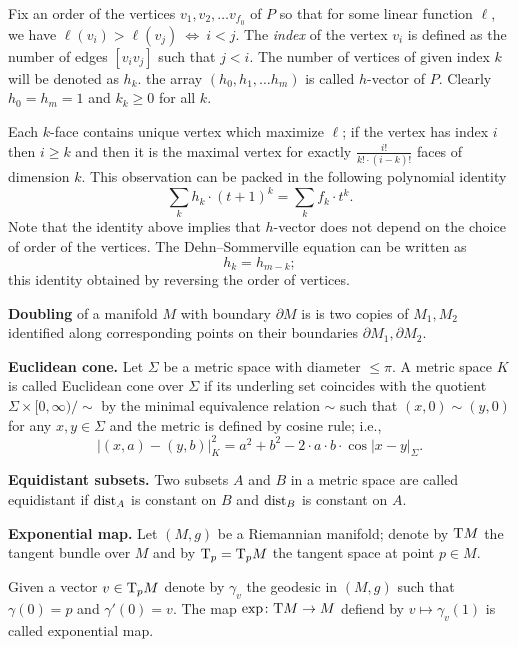 \begin{description}
Fix an order of the vertices $v_1,v_2,\dots v_{f_0}$
of $P$ so that for some linear function $\ell$, we have $\ell(v_i)>\ell(v_j)\ \Leftrightarrow\ i<j$.
The \emph{index} of the vertex $v_i$ 
is defined as the number of edges $[v_iv_j]$ such that $j<i$. 
The number of vertices of given index $k$ will be denoted as $h_k$.
the array $(h_0,h_1,\dots h_m)$ is called $h$-vector of $P$.
Clearly $h_0=h_m=1$ and $k_k\ge 0$ for all $k$.

Each $k$-face contains unique vertex which maximize $\ell$;
if the vertex has index $i$ then $i\ge k$ and
then it is the maximal vertex for exactly $\tfrac{i!}{k!\cdot (i-k)!}$
faces of dimension $k$.
This observation can be packed in the following polynomial identity 
\[\sum_k h_k\cdot (t+1)^k=\sum_k f_k\cdot t^k.\]
Note that the identity above implies that $h$-vector does not depend on the choice of order of the vertices.
The Dehn--Sommerville equation can be written as 
\[h_k=h_{m-k};\]
this identity obtained by reversing the order of vertices.

\item{\bf Doubling}\label{Doubling} of a manifold $M$ with boundary $\partial M$ is is two copies of $M_1, M_2$ identified along corresponding points on their boundaries $\partial M_1, \partial M_2$.

\item{\bf Euclidean cone.}\label{Euclidean cone} 
Let $\Sigma$ be a metric space with diameter $\le \pi$. 
A metric space $K$ is called Euclidean cone over $\Sigma$
if its underling set 
coincides with the quotient 
$\Sigma\times [0,\infty)/{\sim}$
by the minimal equivalence relation $\sim$ such that $(x,0)\sim(y,0)$ for any $x,y\in \Sigma$
and the metric is defined by cosine rule;
i.e.,
$$|(x,a)-(y,b)|^2_K=a^2+b^2-2\cdot a\cdot b\cdot\!\cos|x-y|_\Sigma.$$


\item{\bf Equidistant subsets.}\label{Equidistant subsets} 
Two subsets $A$ and $B$ in a metric space are called equidistant if $\operatorname{\rm dist}_A$ is constant on $B$ and $\operatorname{\rm dist}_B$ is constant on $A$.

\item{\bf Exponential map.}\label{Exponential map} 
Let $(M,g)$ be a Riemannian manifold;
denote by $\mathrm{T} M$ the tangent bundle over $M$ and by $\mathrm{T}_p=\mathrm{T}_pM$ the tangent space at point $p\in M$.

Given a vector $v\in\mathrm{T}_pM$ denote by $\gamma_v$ the geodesic in $(M,g)$
such that $\gamma(0)=p$ and $\gamma'(0)=v$.
The map $\exp\colon\mathrm{T} M\to M$ defiend by $v\mapsto \gamma_v(1)$ is called exponential map.


\end{description}
